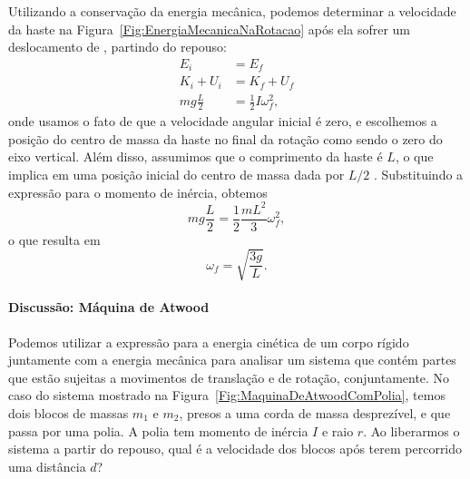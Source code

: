 Utilizando a conservação da energia mecânica, podemos determinar a velocidade da haste na Figura~\ref{Fig:EnergiaMecanicaNaRotacao} após ela sofrer um deslocamento de , partindo do repouso:
\begin{align}
    E_i &= E_f \\
    K_i + U_i &= K_f + U_f \\
    mg\frac{L}{2} &= \frac{1}{2} I \omega_f^2,
\end{align}
%
onde usamos o fato de que a velocidade angular inicial é zero, e escolhemos a posição do centro de massa da haste no final da rotação como sendo o zero do eixo vertical. Além disso, assumimos que o comprimento da haste é $L$, o que implica em uma posição inicial do centro de massa dada por $L/2$ . Substituindo a expressão para o momento de inércia, obtemos
\begin{equation}
    mg\frac{L}{2} = \frac{1}{2} \frac{mL^2}{3} \omega_f^2,
\end{equation}
%
o que resulta em
\begin{equation}
    \omega_f = \sqrt{\frac{3g}{L}}.
\end{equation}

\paragraph{Discussão: Máquina de Atwood}


Podemos utilizar a expressão para a energia cinética de um corpo rígido juntamente com a energia mecânica para analisar um sistema que contém partes que estão sujeitas a movimentos de translação e de rotação, conjuntamente. No caso do sistema mostrado na Figura~\ref{Fig:MaquinaDeAtwoodComPolia}, temos dois blocos de massas $m_1$ e $m_2$, presos a uma corda de massa desprezível, e que passa por uma polia. A polia tem momento de inércia $I$ e raio $r$. Ao liberarmos o sistema a partir do repouso, qual é a velocidade dos blocos após terem percorrido uma distância $d$?

